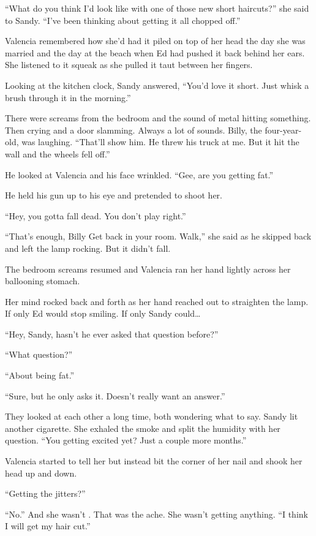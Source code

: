 \documentclass[
]{article}
\begin{document}
``What do you think I'd look like with one of those new short
haircuts?'' she said to Sandy. ``I've been thinking about getting it all
chopped off.''

Valencia remembered how she'd had it piled on top of her head the day
she was married and the day at the beach when Ed had pushed it back
behind her ears. She listened to it squeak as she pulled it taut between
her fingers.

Looking at the kitchen clock, Sandy answered, ``You'd love it short.
Just whisk a brush through it in the morning.''

There were screams from the bedroom and the sound of metal hitting
something. Then crying and a door slamming. Always a lot of sounds.
Billy, the four-year-old, was laughing. ``That'll show him. He threw his
truck at me. But it hit the wall and the wheels fell off.''

He looked at Valencia and his face wrinkled. ``Gee, are you getting
fat.''

He held his gun up to his eye and pretended to shoot her.

``Hey, you gotta fall dead. You don't play right.''

``That's enough, Billy Get back in your room. Walk,'' she said as he
skipped back and left the lamp rocking. But it didn't fall.

The bedroom screams resumed and Valencia ran her hand lightly across her
ballooning stomach.

Her mind rocked back and forth as her hand reached out to straighten the
lamp. If only Ed would stop smiling. If only Sandy could\ldots{}

``Hey, Sandy, hasn't he ever asked that question before?''

``What question?''

``About being fat.''

``Sure, but he only asks it. Doesn't really want an answer.''

They looked at each other a long time, both wondering what to say. Sandy
lit another cigarette. She exhaled the smoke and split the humidity with
her question. ``You getting excited yet? Just a couple more months.''

Valencia started to tell her but instead bit the corner of her nail and
shook her head up and down.

``Getting the jitters?''

``No.'' And she wasn't . That was the ache. She wasn't getting anything.
``I think I will get my hair cut.''
\end{document}
